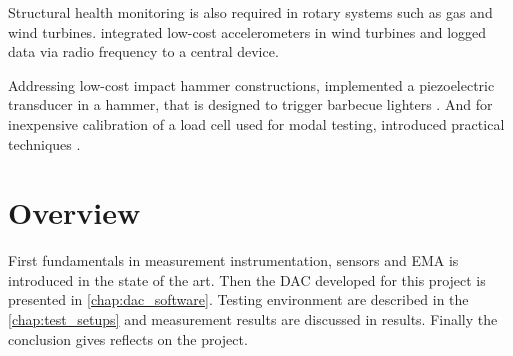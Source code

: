 Structural health monitoring is also required in rotary systems such as gas and wind turbines. \citeauthor{esu2014integration} integrated low-cost accelerometers in wind turbines and logged data via radio frequency to a central device.

Addressing low-cost impact hammer constructions, \citeauthor{waltham2009construction} implemented a piezoelectric transducer in a hammer, that is designed to trigger barbecue lighters \cite{waltham2009construction}. And for inexpensive calibration of a load cell used for modal testing, \citeauthor{wang2015practical} introduced practical techniques \cite{wang2015practical}.

\section{Overview}

First fundamentals in measurement instrumentation, sensors and \ac{EMA} is introduced in the state of the art. Then the \acf{DAC} developed for this project is presented in \autoref{chap:dac_software}. Testing environment are described in the \autoref{chap:test_setups} and measurement results are discussed in results. Finally the conclusion gives reflects on the project.
